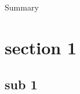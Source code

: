 \documentclass{beamer}
\begin{document}
\begin{frame}{Summary}
\tableofcontents%
\end{frame}

\section{section 1}
\subsection{sub 1}
\frame{}
\end{document}
